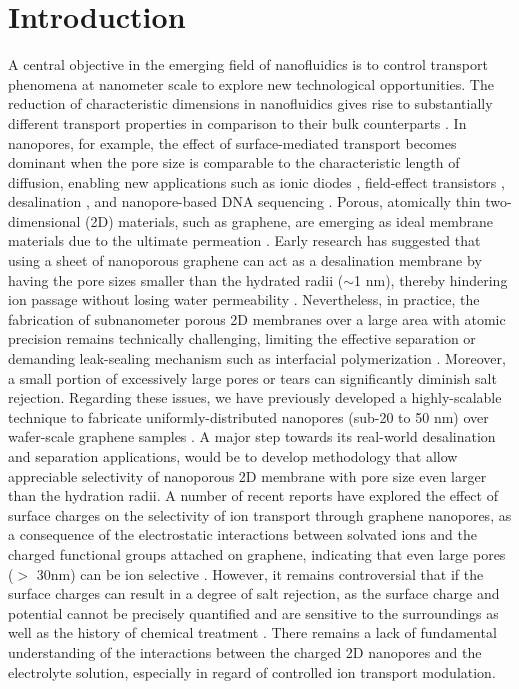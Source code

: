 \documentclass[journal=nalefd,email=true, hyperref=true, keywords=false]{achemso}
\begin{document}
\section{Introduction}
\label{sec:intro}
A central objective in the emerging field of nanofluidics is to
control transport phenomena at nanometer scale to explore new
technological opportunities. The reduction of characteristic
dimensions in nanofluidics gives rise to substantially different
transport properties in comparison to their bulk counterparts
\cite{Schoch_2008}. In nanopores, for example, the effect of
surface-mediated transport becomes dominant when the pore size is
comparable to the characteristic length of diffusion, enabling new
applications such as ionic diodes
\cite{Karnik_2007,siwy2002fabrication,vlassiouk2007nanofluidic},
field-effect transistors \cite{Nam_2009}, desalination
\cite{Heiranian_2015}, and nanopore-based DNA sequencing
\cite{Heerema_2016,Garaj_2013}. Porous, atomically thin
two-dimensional (2D) materials, such as graphene, are emerging as
ideal membrane materials due to the ultimate permeation
\cite{Suk_2010,Jiang_2009,Celebi_2014,Koenig_2012,Drahushuk_2012}. Early
research has suggested that using a sheet of nanoporous graphene can
act as a desalination membrane by having the pore sizes smaller than
the hydrated radii ($\sim$1 nm), thereby hindering ion passage without
losing water permeability
\cite{Cohen_Tanugi_2012,Suk_2014,Cohen_Tanugi_2014,Cohen_Tanugi_2015,O_Hern_2014,O_Hern_2015,Surwade_2015,Walker_2017,Ghosh_2018}.
Nevertheless, in practice, the fabrication of subnanometer porous 2D
membranes over a large area with atomic precision remains technically
challenging, limiting the effective separation or demanding
  leak-sealing mechanism such as interfacial polymerization
\cite{Suk_2014,Rollings_2016,O_Hern_2012,Wang_2017}. Moreover, a small
portion of excessively large pores or tears can significantly diminish
salt rejection. Regarding these issues, we have previously developed a
highly-scalable technique to fabricate uniformly-distributed nanopores
(sub-20 to 50 nm) over wafer-scale graphene samples
\cite{Choi_2018}. A major step towards its real-world desalination and
separation applications, would be to develop methodology that allow
appreciable selectivity of nanoporous 2D membrane with pore size even
larger than the hydration radii.
A number of recent reports have explored the effect of surface charges
on the selectivity of ion transport through graphene nanopores, as a
consequence of the electrostatic interactions between solvated ions
and the charged functional groups attached on graphene, indicating
that even large pores ($>$ 30nm) can be ion selective
\cite{Rollings_2016,Surwade_2014}. However, it remains controversial
that if the surface charges can result in a degree of salt rejection,
as the surface charge and potential cannot be precisely quantified and
are sensitive to the surroundings as well as the history of chemical
treatment \cite{Li_2008}. There remains a lack of fundamental
understanding of the interactions between the charged 2D nanopores and
the electrolyte solution, especially in regard of controlled ion
transport modulation.
\end{document}
